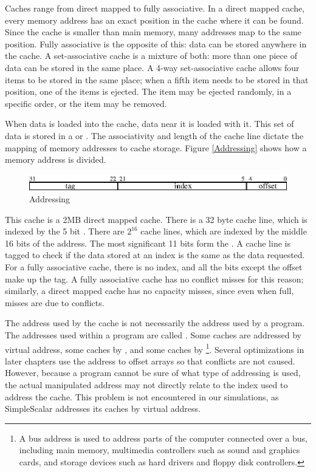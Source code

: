 Caches range from direct mapped to fully associative. In a direct mapped cache,
every memory address has an exact position in the cache where it can be found.
Since the cache is smaller than main memory, many addresses map to the same position.
Fully associative is the opposite of this: data can be stored anywhere in the
cache. A set-associative cache is a mixture of both: more than one piece of data
can be stored in the same place. A 4-way set-associative cache allows four items
to be stored in the same place; when a fifth item needs to be stored in that
position, one of the items is ejected. The item may be ejected randomly, in a
specific order, or the  item may be removed.

When data is loaded into the cache, data near it is loaded with it. This set of
data is stored in a  or . The associativity and
length of the cache line dictate the mapping of memory addresses to cache
storage. Figure \vref{Addressing} shows how a memory address is divided.

\begin{figure}[h]
\centering
\includegraphics{cache_addressing}
\caption{Addressing}
\label{Addressing}
\end{figure}

This cache is a 2MB direct mapped cache.  There is a 32 byte cache line, which
is indexed by the 5 bit . There are $2^{16}$ cache lines, which are
indexed by the middle 16 bits of the address. The most significant 11 bits form
the . A cache line is tagged to check if the data stored at an index is
the same as the data requested. For a fully associative cache, there is no
index, and all the bits except the offset make up the tag. A fully associative
cache has no conflict misses for this reason; similarly, a direct mapped cache
has no capacity misses, since even when full, misses are due to conflicts.

The address used by the cache is not necessarily the address used by a program.
The addresses used within a program 
are called . Some caches are addressed by virtual address,
some caches by , and some caches by \footnote{A bus address is used to address parts of the computer
connected over a bus, including main memory, multimedia controllers such as
sound and graphics cards, and storage devices such as hard drivers and floppy
disk controllers.}. Several optimizations in later chapters use the address to
offset arrays so that conflicts are not caused. However, because a program
cannot be sure of what type of addressing is used, the actual manipulated
address may not directly relate to the index used to address the cache. This
problem is not encountered in our simulations, as SimpleScalar
addresses its caches by virtual address.

